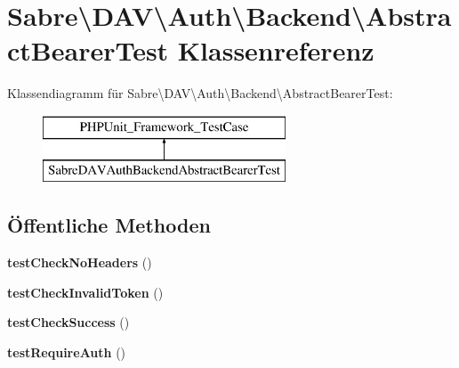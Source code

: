 \hypertarget{class_sabre_1_1_d_a_v_1_1_auth_1_1_backend_1_1_abstract_bearer_test}{}\section{Sabre\textbackslash{}D\+AV\textbackslash{}Auth\textbackslash{}Backend\textbackslash{}Abstract\+Bearer\+Test Klassenreferenz}
\label{class_sabre_1_1_d_a_v_1_1_auth_1_1_backend_1_1_abstract_bearer_test}
Klassendiagramm für Sabre\textbackslash{}D\+AV\textbackslash{}Auth\textbackslash{}Backend\textbackslash{}Abstract\+Bearer\+Test\+:\begin{figure}[H]
\begin{center}
\leavevmode
\includegraphics[height=2.000000cm]{class_sabre_1_1_d_a_v_1_1_auth_1_1_backend_1_1_abstract_bearer_test}
\end{center}
\end{figure}
\subsection*{Öffentliche Methoden}
\begin{DoxyCompactItemize}
\item 
\mbox{\label{class_sabre_1_1_d_a_v_1_1_auth_1_1_backend_1_1_abstract_bearer_test_a4d83ffd566b810aa42a2f36fdc3e5a2c}} 
{\bfseries test\+Check\+No\+Headers} ()
\item 
\mbox{\label{class_sabre_1_1_d_a_v_1_1_auth_1_1_backend_1_1_abstract_bearer_test_aec3186a85b799d6d473d417223bd6331}} 
{\bfseries test\+Check\+Invalid\+Token} ()
\item 
\mbox{\label{class_sabre_1_1_d_a_v_1_1_auth_1_1_backend_1_1_abstract_bearer_test_ad4fad0ff80d28f8b70514b4a0c026b14}} 
{\bfseries test\+Check\+Success} ()
\item 
\mbox{\label{class_sabre_1_1_d_a_v_1_1_auth_1_1_backend_1_1_abstract_bearer_test_a417c4cfdc8d709234cf92ed437024f52}} 
{\bfseries test\+Require\+Auth} ()
\end{DoxyCompactItemize}


